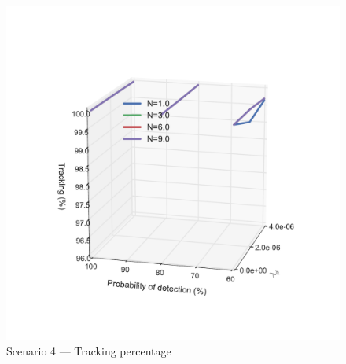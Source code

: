 {\begin{figure}
\includegraphics[height = .46\textheight]{Figures/plots/Scenario4_Tracking-TrackingPercentage.pdf}
\caption{Scenario 4 --- Tracking percentage}\label{fig:scenario4_tracking_percentage}
\end{figure}

}